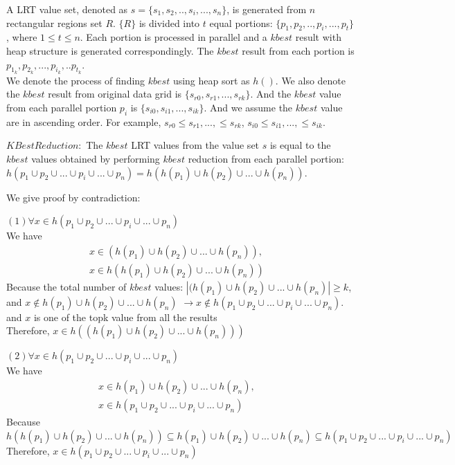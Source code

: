 \documentclass[AMA,LATO1COL]{WileyNJD-v2-bak}
\begin{document}
A LRT value set, denoted as $s=\{s_1,s_2, .., s_i,...,s_n\}$, is generated from $n$ rectangular regions set ${R}$. $\{R\}$ is divided into $t$ equal portions: $\{p_1,p_2,..,p_i,...,p_t\}$, where $1\le t\le n$. Each portion is processed in parallel and a $kbest$ result with heap structure is generated correspondingly. The $kbest$ result from each portion is $p_{1_k},p_{2_k},...,p_{i_k},..p_{t_k}$.\\ We denote the process of finding $kbest$ using heap sort as $h()$. We also denote the $kbest$ result from original data grid is $\{s_{r0},s_{r1},...,s_{rk}\}$. And the $kbest$ value from each parallel portion $p_i$ is $\{s_{i0},s_{i1},...,s_{ik}\}$. And we assume the $kbest$ value are in ascending order. For example, $s_{r0}\le s_{r1},...,\le s_{rk}$, $s_{i0}\le s_{i1},...,\le s_{ik}$.
\begin{lemma}{\bf $KBestReduction:$} The $kbest$ LRT values from the value set ${s}$ is equal to the $kbest$ values obtained by performing $kbest$ reduction from each parallel portion:
$h(p_1\cup p_2\cup ...\cup p_i \cup...\cup p_n)=h(h(p_1)\cup h(p_2)\cup ...\cup h(p_n))$.
\end{lemma}
We give proof by contradiction:

\noindent $(1)\forall x\in h(p_1\cup p_2\cup ...\cup p_i \cup...\cup p_n)$\\
We have
\vspace{-5mm}
\begin{eqnarray}
x\in (h(p_1)\cup h(p_2)\cup ...\cup h(p_n)),&\\
 x\in h(h(p_1)\cup h(p_2)\cup ...\cup h(p_n))
\end{eqnarray}
Because the total number of $kbest$ values:
$|(h(p_1)\cup h(p_2)\cup ...\cup h(p_n)|\ge k$, \\
and $x \notin h(p_1)\cup h(p_2)\cup ...\cup h(p_n)$ $\rightarrow x \notin h(p_1\cup p_2\cup ...\cup p_i \cup...\cup p_n)$.\\   and $x$ is one of the topk value from all the results\\
Therefore, $x\in h((h(p_1)\cup h(p_2)\cup ...\cup h(p_n)))$

\noindent $(2) \forall x\in h(p_1\cup p_2\cup ...\cup p_i \cup...\cup p_n)$\\
We have
\vspace{-5mm}
\begin{eqnarray}
x\in h(p_1)\cup h(p_2)\cup ...\cup h(p_n),&\\
x\in h(p_1\cup p_2\cup ...\cup p_i \cup...\cup p_n)
\end{eqnarray}
Because $h(h(p_1)\cup h(p_2)\cup ...\cup h(p_n))\subseteq h(p_1)\cup h(p_2)\cup ...\cup h(p_n) \subseteq h(p_1\cup p_2\cup ...\cup p_i \cup...\cup p_n)$\\
Therefore, $x\in h(p_1\cup p_2\cup ...\cup p_i \cup...\cup p_n)$
\end{document}
